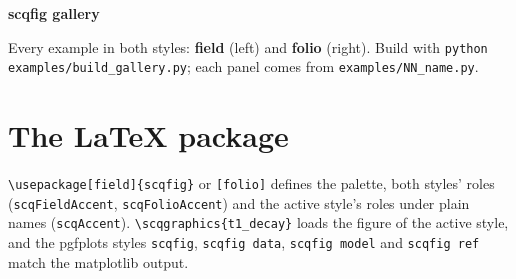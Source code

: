 \documentclass[10pt]{article}
\begin{document}
{\LARGE\bfseries scqfig gallery}\par\medskip
Every example in both styles: \textcolor{scqBlue}{\textbf{field}} (left) and \textbf{folio} (right). Build with \texttt{python examples/build\_gallery.py}; each panel comes from \texttt{examples/NN\_name.py}.\par\bigskip
\section*{\color{scqPurple}The LaTeX package}
\texttt{\textbackslash usepackage[field]\{scqfig\}} or \texttt{[folio]} defines the palette, both styles' roles (\texttt{scqFieldAccent}, \texttt{scqFolioAccent}) and the active style's roles under plain names (\texttt{scqAccent}). \texttt{\textbackslash scqgraphics\{t1\_decay\}} loads the figure of the active style, and the pgfplots styles \texttt{scqfig}, \texttt{scqfig data}, \texttt{scqfig model} and \texttt{scqfig ref} match the matplotlib output.\par\medskip
\end{document}

